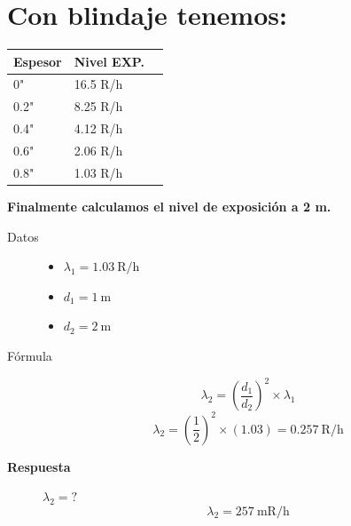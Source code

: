 \section*{Con blindaje tenemos:}

\begin{tabular}{lll}
  \centering
\textbf{Espesor} & \textbf{Nivel EXP.} \\
\hline
0" & 16.5 R/h \\
0.2" & 8.25 R/h \\
0.4" & 4.12 R/h \\
0.6" & 2.06 R/h \\
0.8" & 1.03 R/h \\
\end{tabular}

\bigskip

\textbf{Finalmente calculamos el nivel de exposición a 2 m.}
\begin{description}
    \item[Datos] 
    \begin{itemize}
        \item $\lambda_1 = 1.03 \ \text{R/h}$
        \item $d_1 = 1 \ \text{m}$
        \item $d_2 = 2 \ \text{m}$
    \end{itemize}
    \item[Fórmula] 
    \[
    \lambda_2 = \left(\frac{d_1}{d_2}\right)^2 \times \lambda_1
    \]
    \[
    \lambda_2 = \left(\frac{1}{2}\right)^2 \times (1.03) = 0.257 \ \text{R/h}
    \]
    \item [\textbf{Respuesta}] $\lambda_2 = ?$
    \[
    \lambda_2 = 257 \ \text{mR/h}
    \]
\end{description}
